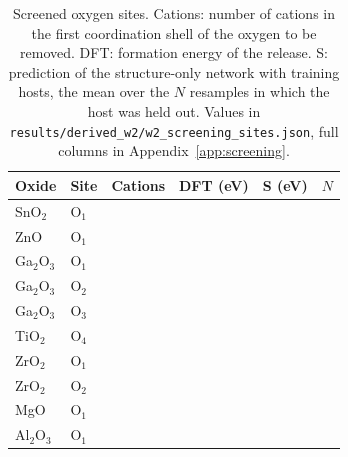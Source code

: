 \begin{table}[H]
\caption{Screened oxygen sites. Cations: number of cations in the first coordination shell of the oxygen to be removed. DFT: formation energy of the release. S: prediction of the structure-only network with \numNetScreenBudget{} training hosts, the mean over the $N$ resamples in which the host was held out. Values in \texttt{results/derived\_w2/w2\_screening\_sites.json}, full columns in Appendix~\ref{app:screening}.\label{tab:screening_sites}}
\centering
\small
\begin{tabular}{llrrrr}
\toprule
Oxide & Site & Cations & DFT (eV) & S (eV) & $N$ \\
\midrule
SnO$_2$ & O$_1$ & \numNetScreenSnOTwoOOneCations{} & \numNetScreenSnOTwoOOneDft{} & \numNetScreenSnOTwoOOnePred{} & \numNetScreenSnOTwoOOneN{} \\
ZnO & O$_1$ & \numNetScreenZnOOOneCations{} & \numNetScreenZnOOOneDft{} & \numNetScreenZnOOOnePred{} & \numNetScreenZnOOOneN{} \\
Ga$_2$O$_3$ & O$_1$ & \numNetScreenGaTwoOThreeOOneCations{} & \numNetScreenGaTwoOThreeOOneDft{} & \numNetScreenGaTwoOThreeOOnePred{} & \numNetScreenGaTwoOThreeOOneN{} \\
Ga$_2$O$_3$ & O$_2$ & \numNetScreenGaTwoOThreeOTwoCations{} & \numNetScreenGaTwoOThreeOTwoDft{} & \numNetScreenGaTwoOThreeOTwoPred{} & \numNetScreenGaTwoOThreeOTwoN{} \\
Ga$_2$O$_3$ & O$_3$ & \numNetScreenGaTwoOThreeOThreeCations{} & \numNetScreenGaTwoOThreeOThreeDft{} & \numNetScreenGaTwoOThreeOThreePred{} & \numNetScreenGaTwoOThreeOThreeN{} \\
TiO$_2$ & O$_4$ & \numNetScreenTiOTwoOFourCations{} & \numNetScreenTiOTwoOFourDft{} & \numNetScreenTiOTwoOFourPred{} & \numNetScreenTiOTwoOFourN{} \\
ZrO$_2$ & O$_1$ & \numNetScreenZrOTwoOOneCations{} & \numNetScreenZrOTwoOOneDft{} & \numNetScreenZrOTwoOOnePred{} & \numNetScreenZrOTwoOOneN{} \\
ZrO$_2$ & O$_2$ & \numNetScreenZrOTwoOTwoCations{} & \numNetScreenZrOTwoOTwoDft{} & \numNetScreenZrOTwoOTwoPred{} & \numNetScreenZrOTwoOTwoN{} \\
MgO & O$_1$ & \numNetScreenMgOOOneCations{} & \numNetScreenMgOOOneDft{} & \numNetScreenMgOOOnePred{} & \numNetScreenMgOOOneN{} \\
Al$_2$O$_3$ & O$_1$ & \numNetScreenAlTwoOThreeOOneCations{} & \numNetScreenAlTwoOThreeOOneDft{} & \numNetScreenAlTwoOThreeOOnePred{} & \numNetScreenAlTwoOThreeOOneN{} \\
\bottomrule
\end{tabular}
\end{table}

